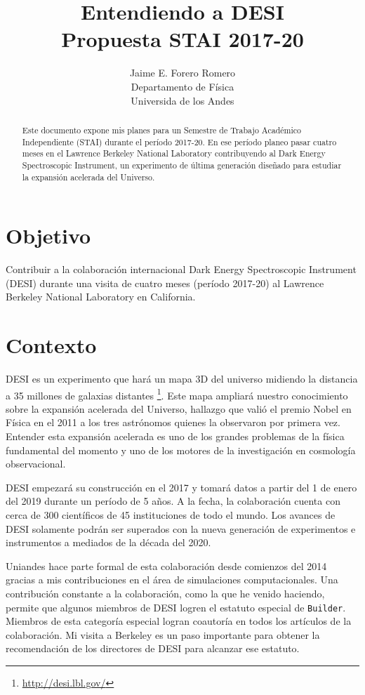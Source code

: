 \documentclass[12pt,spanish]{article}
\title{{\sc Entendiendo a DESI}\\{\small\sc Propuesta STAI 2017-20}}
\author{Jaime E. Forero Romero\\Departamento de F\'isica\\Universida
  de los Andes}
\begin{document}
\maketitle
\begin{abstract}
Este documento expone mis planes para un Semestre de Trabajo Acad\'emico
Independiente (STAI) durante el per\'iodo 2017-20. 
En ese per\'iodo planeo pasar cuatro meses en el Lawrence Berkeley
National Laboratory contribuyendo al Dark Energy Spectroscopic
Instrument, un experimento de \'ultima generaci\'on dise\~nado para
estudiar la expansi\'on acelerada del Universo.
\end{abstract}





\section*{Objetivo}

Contribuir a la colaboraci\'on internacional Dark Energy Spectroscopic
Instrument (DESI) durante una visita de cuatro meses (per\'iodo
2017-20) al Lawrence Berkeley National Laboratory en California.  


\section*{Contexto}
DESI es un experimento que har\'a un mapa 3D del universo midiendo la
distancia a 35 millones de galaxias
distantes \footnote{\url{http://desi.lbl.gov/}}. 
Este mapa ampliar\'a nuestro conocimiento sobre la
expansi\'on acelerada del Universo, hallazgo que vali\'o el premio
Nobel en  F\'isica en el 2011 a los tres astr\'onomos quienes la observaron
por primera vez. Entender esta  expansi\'on acelerada es uno de los
grandes problemas de la f\'isica fundamental del momento y uno de los
motores de la investigaci\'on en cosmolog\'ia observacional.



DESI empezar\'a su construcci\'on en el 2017 y tomar\'a datos a
partir del 1 de enero del 2019 durante un per\'iodo de 5 a\~nos. 
A la fecha, la colaboraci\'on cuenta con cerca de 300 cient\'ificos de
45 instituciones de todo el mundo. 
Los avances de DESI solamente podr\'an  ser superados con la nueva
generaci\'on de experimentos e instrumentos a mediados de la d\'ecada
del 2020. 

Uniandes hace parte formal de esta colaboraci\'on desde comienzos del
2014 gracias a mis contribuciones en el \'area de simulaciones
computacionales. 
Una contribuci\'on constante a la colaboraci\'on, como la que he
venido haciendo, permite que algunos miembros de DESI logren el
estatuto especial de \texttt{Builder}. Miembros de esta 
categor\'ia especial logran coautor\'ia en todos los art\'iculos de la
colaboraci\'on. Mi visita a Berkeley es un paso importante para
obtener la recomendaci\'on de los directores de DESI para
alcanzar ese estatuto.
\end{document}
